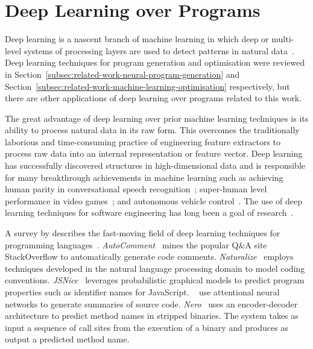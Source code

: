 \section{Deep Learning over Programs}
\label{sec:related-work-other}

Deep learning is a nascent branch of machine learning in which deep or multi-level systems of processing layers are used to detect patterns in natural data~\cite{LeCun2015,Wang2017}. Deep learning techniques for program generation and optimisation were reviewed in Section~\ref{subsec:related-work-neural-program-generation} and Section~\ref{subsec:related-work-machine-learning-optimisation} respectively, but there are other applications of deep learning over programs related to this work.

The great advantage of deep learning over prior machine learning techniques is its ability to process natural data in its raw form. This overcomes the traditionally laborious and time-consuming practice of engineering feature extractors to process raw data into an internal representation or feature vector. Deep learning has successfully discovered structures in high-dimensional data and is responsible for many breakthrough achievements in machine learning such as achieving human parity in conversational speech recognition~\cite{Xiong2016}; super-human level performance in video games~\cite{Mnih2015}; and autonomous vehicle control~\cite{Lozano-Perez2012}. The use of deep learning techniques for software engineering has long been a goal of research~\cite{White2015a}.

A \citeyear{Allamanis2017a} survey by \citeauthor{Allamanis2017a} describes the fast-moving field of deep learning techniques for programming languages~\cite{Allamanis2017a}. \emph{AutoComment}~\cite{Wong2013} mines the popular Q\&A site StackOverflow to automatically generate code comments. \emph{Naturalize}~\cite{Allamanis2014a} employs techniques developed in the natural language processing domain to model coding conventions. \emph{JSNice}~\cite{Raychev2015} leverages probabilistic graphical models to predict program properties such as identifier names for JavaScript. \citeauthor{Allamanis2016}~\cite{Allamanis2016} use attentional neural networks to generate summaries of source code. \emph{Nero}~\cite{David2019} uses an encoder-decoder architecture to predict method names in stripped binaries. The system takes as input a sequence of call sites from the execution of a binary and produces as output a predicted method name.

